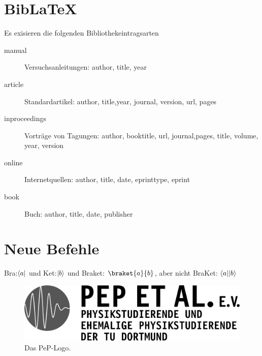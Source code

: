 \section{Bib\LaTeX}

Es exisieren die folgenden Bibliothekeintragsarten
\begin{description}
	\item[manual] Versuchsanleitungen: author, title, year
	\item[article] Standardartikel: author, title,year, journal, version, url, pages
	\item[inproceedings] Vorträge von Tagungen: author, booktitle, url, journal,pages, title, volume, year, version
	\item[online] Internetquellen: author, title, date, eprinttype, eprint
	\item[book]  Buch: author, title, date, publisher
\end{description}
\nocite{*}
\printbibliography


\section{Neue Befehle}

Bra:$\langle a\rvert$ 
und Ket:$\rvert b\rangle$
und Braket: $\braket{a}{b}$, 
aber nicht BraKet: $\langle a\rvert\rvert b\rangle$ 
\begin{landscape}
	\begin{figure}[p]
	\centering
	\includegraphics[width=\textwidth,draft,]{Pictures/peplogox.png}
	\caption{Das PeP-Logo.}
\end{figure}
\end{landscape}

